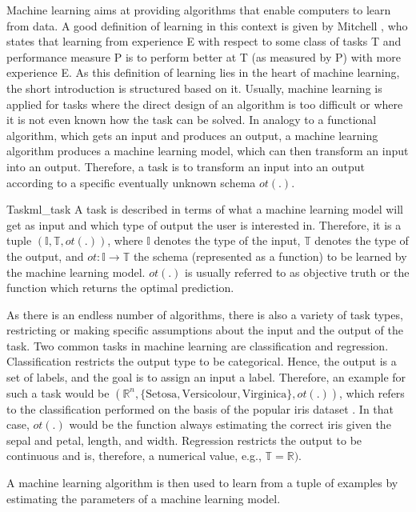 
Machine learning aims at providing algorithms that enable computers to learn from data. A good definition of learning in this context is given by Mitchell \cite{mitchell1997machine}, who states that learning from experience E with respect to some class of tasks T and performance measure P is to perform better at T (as measured by P) with more experience E.
As this definition of learning lies in the heart of machine learning, the short introduction is structured based on it.
Usually, machine learning is applied for tasks where the direct design of an algorithm is too difficult or where it is not even known how the task can be solved. In analogy to a functional algorithm, which gets an input and produces an output, a machine learning algorithm produces a machine learning model, which can then transform an input into an output. Therefore, a task is to transform an input into an output according to a specific eventually unknown schema $ot(.)$. \cite{bengio2017deep}

\begin{Def}{Task}{ml_task}
A task is described in terms of what a machine learning model will get as input and which type of output the user is interested in. Therefore, it is a tuple $(\mathbb{I}, \mathbb{T}, ot(.))$, where $\mathbb{I}$ denotes the type of the input, $\mathbb{T}$ denotes the type of the output, and $ot: \mathbb{I} \to \mathbb{T}$ the schema (represented as a function) to be learned by the machine learning model. $ot(.)$ is usually referred to as objective truth or the function which returns the optimal prediction.
\end{Def}

As there is an endless number of algorithms, there is also a variety of task types, restricting or making specific assumptions about the input and the output of the task. Two common tasks in machine learning are classification and regression. Classification restricts the output type to be categorical. Hence, the output is a set of labels, and the goal is to assign an input a label. Therefore, an example for such a task would be $(\mathbb{R}^n, \{\text{Setosa},\text{Versicolour},\text{Virginica}\},ot(.))$, which refers to the classification performed on the basis of the popular iris dataset \cite{iris}. In that case, $ot(.)$ would be the function always estimating the correct iris given the sepal and petal, length, and width. Regression restricts the output to be continuous and is, therefore, a numerical value, e.g., $\mathbb{T} = \mathbb{R})$.

A machine learning algorithm is then used to learn from a tuple of examples by estimating the parameters of a machine learning model.

